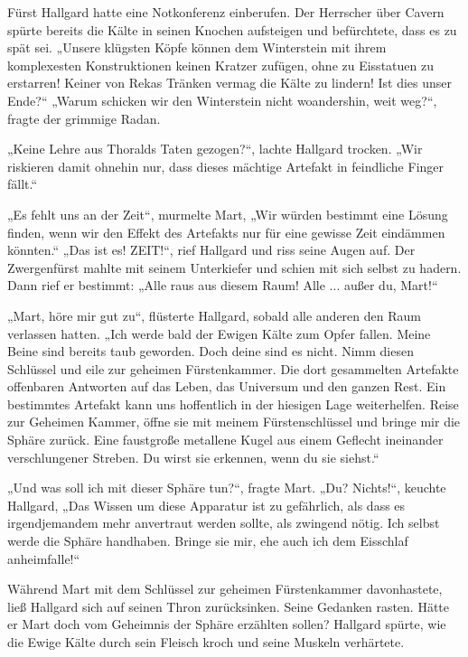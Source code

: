 Fürst Hallgard hatte eine Notkonferenz einberufen. Der Herrscher über Cavern spürte bereits die Kälte in seinen Knochen aufsteigen und befürchtete, dass es zu spät sei. „Unsere klügsten Köpfe können dem Winterstein mit ihrem komplexesten Konstruktionen keinen Kratzer zufügen, ohne zu Eisstatuen zu erstarren! Keiner von Rekas Tränken vermag die Kälte zu lindern! Ist dies unser Ende?“ „Warum schicken wir den Winterstein nicht woandershin, weit weg?“, fragte der grimmige Radan. 

„Keine Lehre aus Thoralds Taten gezogen?“, lachte Hallgard trocken. „Wir riskieren damit ohnehin nur, dass dieses mächtige Artefakt in feindliche Finger fällt.“

„Es fehlt uns an der Zeit“, murmelte Mart, „Wir würden bestimmt eine Lösung finden, wenn wir den Effekt des Artefakts nur für eine gewisse Zeit eindämmen könnten.“ „Das ist es! ZEIT!“, rief Hallgard und riss seine Augen auf. Der Zwergenfürst mahlte mit seinem Unterkiefer und schien mit sich selbst zu hadern. Dann rief er bestimmt: „Alle raus aus diesem Raum! Alle ... außer du, Mart!“

„Mart, höre mir gut zu“, flüsterte Hallgard, sobald alle anderen den Raum verlassen hatten. „Ich werde bald der Ewigen Kälte zum Opfer fallen. Meine Beine sind bereits taub geworden. Doch deine sind es nicht. Nimm diesen Schlüssel und eile zur geheimen Fürstenkammer. Die dort gesammelten Artefakte offenbaren Antworten auf das Leben, das Universum und den ganzen Rest. Ein bestimmtes Artefakt kann uns hoffentlich in der hiesigen Lage weiterhelfen. Reise zur Geheimen Kammer, öffne sie mit meinem Fürstenschlüssel und bringe mir die Sphäre zurück. Eine faustgroße metallene Kugel aus einem Geflecht ineinander verschlungener Streben. Du wirst sie erkennen, wenn du sie siehst.“ 

„Und was soll ich mit dieser Sphäre tun?“, fragte Mart. „Du? Nichts!“, keuchte Hallgard, „Das Wissen um diese Apparatur ist zu gefährlich, als dass es irgendjemandem mehr anvertraut werden sollte, als zwingend nötig. Ich selbst werde die Sphäre handhaben. Bringe sie mir, ehe auch ich dem Eisschlaf anheimfalle!“



\trennzeichen



Während Mart mit dem Schlüssel zur geheimen Fürstenkammer davonhastete, ließ Hallgard sich auf seinen Thron zurücksinken. Seine Gedanken rasten. Hätte er Mart doch vom Geheimnis der Sphäre erzählten sollen? Hallgard spürte, wie die Ewige Kälte durch sein Fleisch kroch und seine Muskeln verhärtete.

